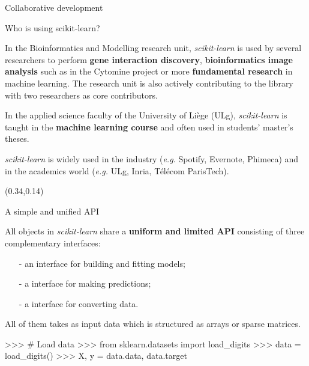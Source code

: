 \documentclass[final]{beamer}
\newcommand{\sklearn}{\textit{scikit-learn}\xspace}
\begin{document}
\begin{frame}[fragile]
\begin{textblock}{0.32}
\begin{block}{Collaborative development \phantom{p}}
\end{block}


\begin{block}{Who is using scikit-learn? \phantom{p}}

In the Bioinformatics and Modelling research unit, \sklearn is used by several
researchers to perform \textbf{gene interaction discovery},
\textbf{bioinformatics image analysis} such as in the Cytomine project or
more \textbf{fundamental research} in machine learning.
The research unit is also actively contributing to the library with two
researchers as core contributors.

\vspace{0.3cm}

In the applied science faculty of the University of Liège (ULg), \sklearn is
taught in the \textbf{machine learning course} and often used in students'
master's theses.

\vspace{0.3cm}

\sklearn is widely used in the industry (\emph{e.g.} Spotify, Evernote,
Phimeca) and in the academics world (\emph{e.g.} ULg, Inria,
Télécom ParisTech).
\end{block}

\end{textblock}




\begin{textblock}{0.32}(0.34,0.14)
\begin{block}{A simple and unified API \phantom{p}}

All objects in \sklearn share a \textbf{uniform and limited API}
consisting of three complementary interfaces:
\begin{itemize}
\item[-] an  interface for building and fitting models;
\item[-] a  interface for making predictions;
\item[-] a  interface for converting data.
\end{itemize}
All of them takes as input data which is structured as  arrays
or  sparse matrices.
\begin{pythoncode}
>>> # Load data
>>> from sklearn.datasets import load_digits
>>> data = load_digits()
>>> X, y = data.data, data.target


\end{pythoncode}
\end{block}
\end{textblock}
\end{frame}
\end{document}

